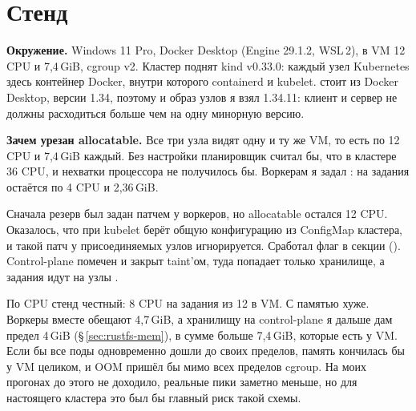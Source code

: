 {\small\setcounter{tocdepth}{1}\tableofcontents}

\newpage
\section{Стенд}\label{sec:stand}

\figStand

\begin{minipage}[t]{0.49\linewidth}
\small
\textbf{Окружение.} Windows 11 Pro, Docker Desktop (Engine 29.1.2, WSL\,2), в VM 12 CPU и 7,4\,GiB, cgroup v2. Кластер поднят kind v0.33.0: каждый узел Kubernetes здесь контейнер Docker, внутри которого containerd и kubelet.  стоит из Docker Desktop, версии 1.34, поэтому и образ узлов я взял 1.34.11: клиент и сервер не должны расходиться больше чем на одну минорную версию.
\end{minipage}\hfill
\begin{minipage}[t]{0.49\linewidth}
\small
\textbf{Зачем урезан allocatable.} Все три узла видят одну и ту же VM, то есть по 12 CPU и 7,4\,GiB каждый. Без настройки планировщик считал бы, что в кластере 36 CPU, и нехватки процессора не получилось бы. Воркерам я задал : на задания остаётся по 4 CPU и 2,36\,GiB.
\end{minipage}


Сначала резерв был задан патчем  у воркеров, но allocatable остался 12 CPU. Оказалось, что при  kubelet берёт общую конфигурацию из ConfigMap кластера, и такой патч у присоединяемых узлов игнорируется. Сработал флаг  в  секции  (). Control-plane помечен  и закрыт taint'ом, туда попадает только хранилище, а задания идут на узлы .

По CPU стенд честный: 8 CPU на задания из 12 в VM. С памятью хуже. Воркеры вместе обещают 4,7\,GiB, а хранилищу на control-plane я дальше дам предел 4\,GiB (\S\,\ref{sec:rustfs-mem}), в сумме больше 7,4\,GiB, которые есть у VM. Если бы все поды одновременно дошли до своих пределов, память кончилась бы у VM целиком, и OOM пришёл бы мимо всех пределов cgroup. На моих прогонах до этого не доходило, реальные пики заметно меньше, но для настоящего кластера это был бы главный риск такой схемы.

